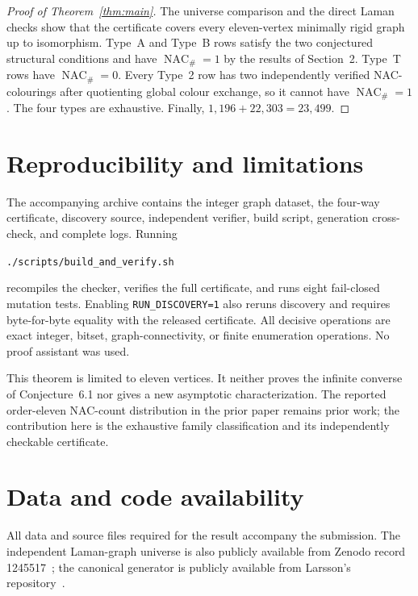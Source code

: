 \documentclass[11pt]{amsart}
\theoremstyle{definition}
\newcommand{\NACnum}{\operatorname{NAC}_{\#}}
\begin{document}
\begin{proof}[Proof of Theorem~\ref{thm:main}]
The universe comparison and the direct Laman checks show that the certificate
covers every eleven-vertex minimally rigid graph up to isomorphism.  Type~A
and Type~B rows satisfy the two conjectured structural conditions and have
$\NACnum=1$ by the results of Section~2.  Type~T rows have $\NACnum=0$.
Every Type~2 row has two independently verified NAC-colourings after quotienting
global colour exchange, so it cannot have $\NACnum=1$.  The four types are
exhaustive.  Finally, $1{,}196+22{,}303=23{,}499$.
\end{proof}

\section{Reproducibility and limitations}

The accompanying archive contains the integer graph dataset, the four-way
certificate, discovery source, independent verifier, build script, generation
cross-check, and complete logs.  Running
\begin{center}
\texttt{./scripts/build\_and\_verify.sh}
\end{center}
recompiles the checker, verifies the full certificate, and runs eight
fail-closed mutation tests.  Enabling \texttt{RUN\_DISCOVERY=1} also reruns
discovery and requires byte-for-byte equality with the released certificate.
All decisive operations are exact integer, bitset, graph-connectivity, or
finite enumeration operations.  No proof assistant was used.

This theorem is limited to eleven vertices.  It neither proves the infinite
converse of Conjecture~6.1 nor gives a new asymptotic characterization.  The
reported order-eleven NAC-count distribution in the prior paper remains prior
work; the contribution here is the exhaustive family classification and its
independently checkable certificate.

\section*{Data and code availability}

All data and source files required for the result accompany the submission.
The independent Laman-graph universe is also publicly available from Zenodo
record 1245517~\cite{capco2018data}; the canonical generator is publicly
available from Larsson's repository~\cite{larsson}.



\end{document}
